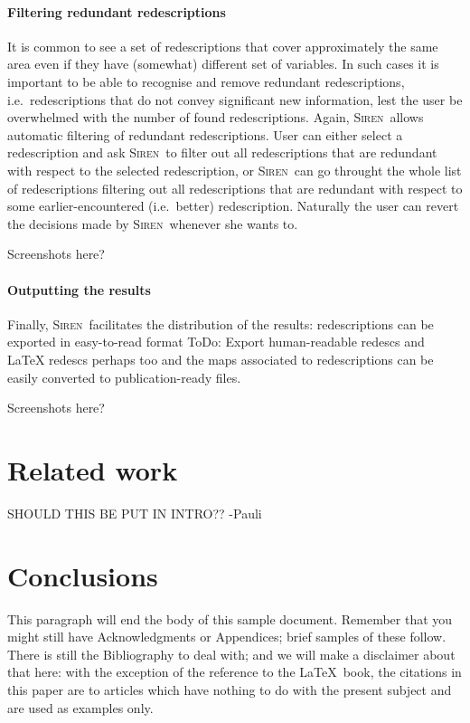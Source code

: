 \documentclass{sig-alternate}
\newcommand{\note}[1]{{\color{red}#1}}
\newcommand{\Siren}{\textsc{Siren}}
\begin{document}
\paragraph{Filtering redundant redescriptions}
\label{sec:filt-redund-redescr}
It is common to see a set of redescriptions that cover approximately
the same area even if they have (somewhat) different set of
variables. In such cases it is important to be able to recognise and
remove redundant redescriptions, i.e.\ redescriptions that do not
convey significant new information, lest the user be overwhelmed with
the number of found redescriptions. Again, \Siren\ allows automatic
filtering of redundant redescriptions. User can either select a
redescription and ask \Siren\ to filter out all redescriptions that
are redundant with respect to the selected redescription, or \Siren\
can go throught the whole list of redescriptions filtering out all
redescriptions that are redundant with respect to some
earlier-encountered (i.e.\ better) redescription. Naturally the user
can revert the decisions made by \Siren\ whenever she wants to.

\note{Screenshots here?}

\paragraph{Outputting the results}
\label{sec:outputting-results}
Finally, \Siren\ facilitates the distribution of the results:
redescriptions can be exported in easy-to-read format \note{ToDo:
  Export human-readable redescs and LaTeX redescs perhaps too} and the
maps associated to redescriptions can be easily converted to
publication-ready files. 

\note{Screenshots here?}

\section{Related work}
\label{sec:related-work}

\note{SHOULD THIS BE PUT IN INTRO?? -Pauli}


\section{Conclusions}
This paragraph will end the body of this sample document.
Remember that you might still have Acknowledgments or
Appendices; brief samples of these
follow.  There is still the Bibliography to deal with; and
we will make a disclaimer about that here: with the exception
of the reference to the \LaTeX\ book, the citations in
this paper are to articles which have nothing to
do with the present subject and are used as
examples only.



\nocite{*}
  

\balancecolumns
\end{document}
